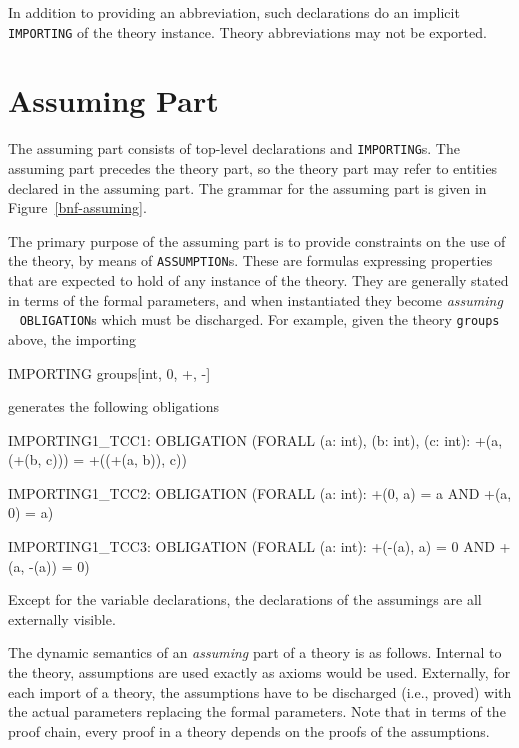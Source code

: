 In addition to providing an abbreviation, such declarations do an
implicit \texttt{IMPORTING} of the theory instance.
Theory abbreviations may not be exported.


\section{Assuming Part}\label{assuming}

The assuming part consists of top-level declarations and \texttt{IMPORTING}s.
The assuming part precedes the theory part, so the
theory part may refer to entities declared in the assuming part.  The
grammar for the assuming part is given in Figure~\ref{bnf-assuming}.


The primary purpose of the assuming part is to provide constraints on the
use of the theory, by means of \texttt{ASSUMPTION}s.  These are formulas
expressing properties that are expected to hold of any instance of the
theory.  They are generally stated in terms of the formal parameters, and
when instantiated they become \emph{assuming} \tccs\  \texttt{OBLIGATION}s which must be discharged.  For
example, given the theory \texttt{groups} above, the importing
\begin{pvsex}
  IMPORTING groups[int, 0, +, -]
\end{pvsex}
generates the following obligations
\begin{pvsex}
  IMPORTING1_TCC1: OBLIGATION
    (FORALL (a: int), (b: int), (c: int):
         +(a, (+(b, c))) = +((+(a, b)), c))
  
  IMPORTING1_TCC2: OBLIGATION (FORALL (a: int):
         +(0, a) = a AND +(a, 0) = a)
  
  IMPORTING1_TCC3: OBLIGATION (FORALL (a: int):
         +(-(a), a) = 0 AND +(a, -(a)) = 0)
\end{pvsex}

Except for the variable declarations, the declarations of the assumings
are all externally visible.  
  
The dynamic semantics of an \emph{assuming} part of a theory is as
follows.  Internal to the theory, assumptions are used exactly as axioms
would be used.  Externally, for each import of a theory, the assumptions
have to be discharged (i.e., proved) with the actual parameters replacing
the formal parameters.  Note that in terms of the proof chain, every proof
in a theory depends on the proofs of the assumptions.

